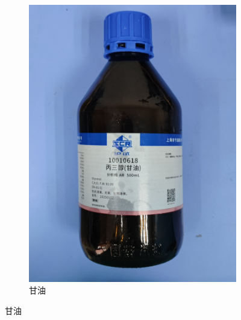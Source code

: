 \documentclass[a4paper]{report} %
\begin{document}
\begin{figure}[H]
\begin{subfigure}{0.22\textwidth}
        \includegraphics[width=\linewidth]{甘油.jpg}
        \caption{甘油}
    \end{subfigure}


\end{figure}
\end{document}
